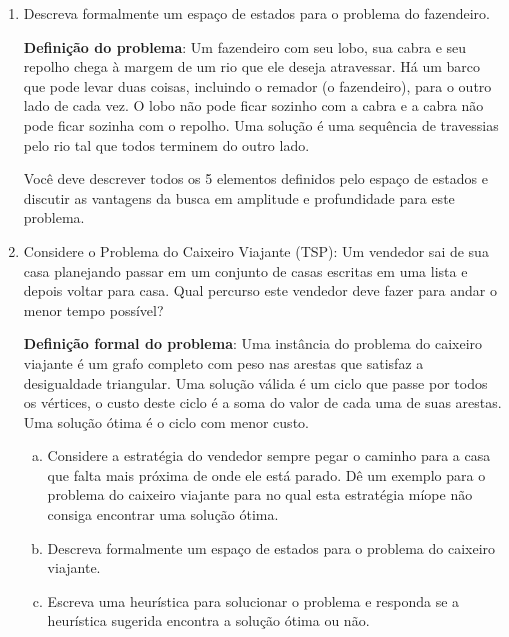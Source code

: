 \documentclass[12pt]{article}
\begin{document}
\begin{enumerate}

\item Descreva formalmente um espaço de estados para o problema do fazendeiro.

\textbf{Definição do problema}: Um fazendeiro com seu lobo, sua cabra e seu repolho chega à margem de um rio que ele deseja atravessar. Há um barco que pode levar duas coisas, incluindo o remador (o fazendeiro), para o outro lado de cada vez. O lobo não pode ficar sozinho com a cabra e a cabra não pode ficar sozinha com o repolho. Uma solução é uma sequência de travessias pelo rio tal que todos terminem do outro lado.

Você deve descrever todos os 5 elementos definidos pelo espaço de estados e discutir as vantagens da busca em amplitude e profundidade para este problema.



\break





\item Considere o Problema do Caixeiro Viajante (TSP): Um vendedor sai de sua casa planejando passar em um conjunto de casas escritas em uma lista e depois voltar para casa. Qual percurso este vendedor deve fazer para andar o menor tempo possível?

\textbf{Definição formal do problema}: Uma instância do problema do caixeiro viajante é um grafo completo com peso nas arestas que satisfaz a desigualdade triangular. Uma solução válida é um ciclo que passe por todos os vértices, o custo deste ciclo é a soma do valor de cada uma de suas arestas. Uma solução ótima é o ciclo com menor custo.

\begin{enumerate}[a)]

\item Considere a estratégia do vendedor sempre pegar o caminho para a casa que falta mais próxima de onde ele está parado. Dê um exemplo para o problema do caixeiro viajante para no qual esta estratégia míope não consiga encontrar uma solução ótima. 

\item Descreva formalmente um espaço de estados para o problema do caixeiro viajante. 

\item Escreva uma heurística para solucionar o problema e responda se a heurística sugerida encontra a solução ótima ou não.\\
\end{enumerate}







\end{enumerate}
\end{document}
